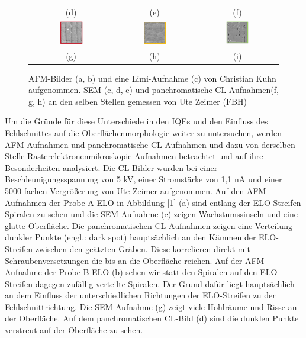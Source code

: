 \begin{figure}[H]
\begin{tabular}{ccc}
(d)  & (e) & (f)   \\[6pt]
\includegraphics[width=0.30\textwidth]{Bilder/TS4045/aELOcl1.png} & \includegraphics[width=0.30\textwidth]{Bilder/TS4045/bELOcl1.png}  & \includegraphics[width=0.30\textwidth]{Bilder/TS4045/cELOcl1.png} \\
(g)  & (h) & (i)   \\[6pt]
\end{tabular}
\caption{AFM-Bilder (a, b) und eine Limi-Aufnahme (c) von Christian Kuhn aufgenommen. SEM (c, d, e) und panchromatische CL-Aufnahmen(f, g, h) an den selben Stellen gemessen von Ute Zeimer (FBH)}
\label{fig:morph1}
\end{figure}
\noindent 
Um die Gründe für diese Unterschiede in den IQEs und den Einfluss des Fehlschnittes auf die Oberflächenmorphologie weiter zu untersuchen, werden AFM-Aufnahmen und panchromatische CL-Aufnahmen und dazu von derselben Stelle Rasterelektronenmikroskopie-Aufnahmen betrachtet und auf ihre Besonderheiten analysiert. Die CL-Bilder wurden bei einer Beschleunigungsspannung von 5 kV,
einer Stromstärke von 1,1 nA und einer 5000-fachen Vergrößerung von Ute Zeimer aufgenommen.
Auf den AFM-Aufnahmen der Probe A-ELO in Abbildung [\ref{fig:morph1}] (a) sind entlang der ELO-Streifen Spiralen zu sehen und die SEM-Aufnahme (c) zeigen Wachstumssinseln und eine glatte Oberfläche. Die panchromatischen CL-Aufnahmen zeigen eine Verteilung dunkler Punkte (engl.: dark spot) hauptsächlich an den Kämmen der ELO-Streifen zwischen den geätzten Gräben. Diese  korrelieren direkt mit Schraubenversetzungen die bis an die Oberfläche reichen. Auf der AFM-Aufnahme der Probe B-ELO (b) sehen wir statt den Spiralen auf den ELO-Streifen dagegen zufällig verteilte Spiralen. Der Grund dafür liegt hauptsächlich an dem Einfluss der unterschiedlichen Richtungen der ELO-Streifen zu der Fehlschnittrichtung. Die SEM-Aufnahme (g) zeigt viele Hohlräume und Risse an der Oberfläche. Auf dem panchromatischen CL-Bild (d) sind die dunklen Punkte verstreut auf der Oberfläche zu sehen. 

